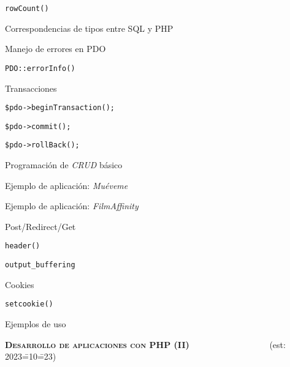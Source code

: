 \begin{longenum}
\begin{longenum}
\begin{longenum}
\begin{longenum}
                \item \texttt{rowCount()}
            \end{longenum}
            \item Correspondencias de tipos entre SQL y PHP
            \item Manejo de errores en PDO
            \begin{longenum}
                \item \texttt{PDO::errorInfo()}
            \end{longenum}
            \item Transacciones
            \begin{longenum}
                \item \texttt{\$pdo->beginTransaction();}
                \item \texttt{\$pdo->commit();}
                \item \texttt{\$pdo->rollBack();}
            \end{longenum}
        \end{longenum}
        \item Programación de \textit{CRUD} básico
        \begin{longenum}
            \item Ejemplo de aplicación: \textit{Muéveme} 
            \item Ejemplo de aplicación: \textit{FilmAffinity} 
        \end{longenum}
        \item Post/Redirect/Get
        \item \texttt{header()}
        \begin{longenum}
            \item \texttt{output\_buffering}
        \end{longenum}
        \item Cookies
        \begin{longenum}
            \item \texttt{setcookie()}
            \item Ejemplos de uso
        \end{longenum}
    \end{longenum}
    \item \textbf{\textsc{Desarrollo de aplicaciones con PHP (II)}} \ \ \ \ \ \ \ \ \ \ \ \ \ \ \ \ \ \ (est: 2023\==10\==23)
    \begin{longenum}

\end{longenum}
\end{longenum}
